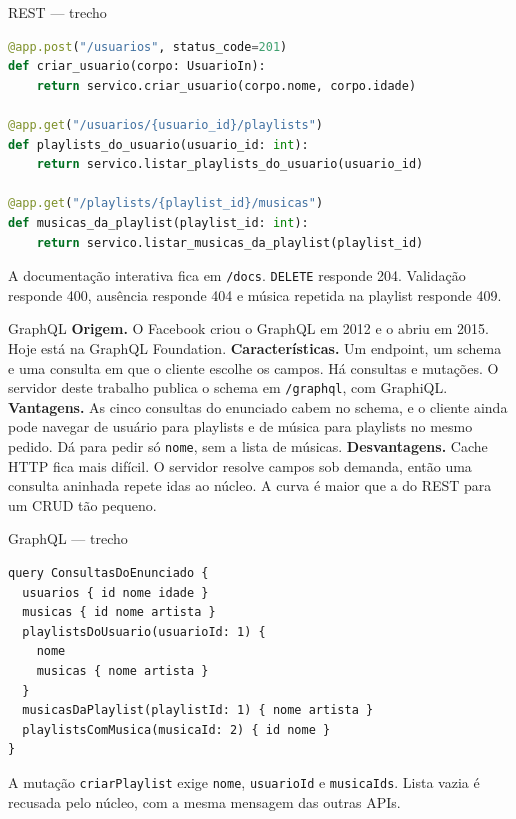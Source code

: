 \documentclass[aspectratio=169,11pt]{beamer}
\begin{document}
\begin{frame}[fragile]{REST --- trecho}
\begin{lstlisting}[language=Python]
@app.post("/usuarios", status_code=201)
def criar_usuario(corpo: UsuarioIn):
    return servico.criar_usuario(corpo.nome, corpo.idade)

@app.get("/usuarios/{usuario_id}/playlists")
def playlists_do_usuario(usuario_id: int):
    return servico.listar_playlists_do_usuario(usuario_id)

@app.get("/playlists/{playlist_id}/musicas")
def musicas_da_playlist(playlist_id: int):
    return servico.listar_musicas_da_playlist(playlist_id)
\end{lstlisting}
A documentação interativa fica em \texttt{/docs}. \texttt{DELETE} responde 204. Validação responde 400, ausência responde 404 e música repetida na playlist responde 409.
\end{frame}

\begin{frame}{GraphQL}
  \textbf{Origem.} O Facebook criou o GraphQL em 2012 e o abriu em 2015. Hoje está na GraphQL Foundation.
  \vspace{0.35em}
  \textbf{Características.} Um endpoint, um schema e uma consulta em que o cliente escolhe os campos. Há consultas e mutações. O servidor deste trabalho publica o schema em \texttt{/graphql}, com GraphiQL.
  \vspace{0.35em}
  \textbf{Vantagens.} As cinco consultas do enunciado cabem no schema, e o cliente ainda pode navegar de usuário para playlists e de música para playlists no mesmo pedido. Dá para pedir só \texttt{nome}, sem a lista de músicas.
  \vspace{0.35em}
  \textbf{Desvantagens.} Cache HTTP fica mais difícil. O servidor resolve campos sob demanda, então uma consulta aninhada repete idas ao núcleo. A curva é maior que a do REST para um CRUD tão pequeno.
\end{frame}

\begin{frame}[fragile]{GraphQL --- trecho}
\begin{lstlisting}
query ConsultasDoEnunciado {
  usuarios { id nome idade }
  musicas { id nome artista }
  playlistsDoUsuario(usuarioId: 1) {
    nome
    musicas { nome artista }
  }
  musicasDaPlaylist(playlistId: 1) { nome artista }
  playlistsComMusica(musicaId: 2) { id nome }
}
\end{lstlisting}
A mutação \texttt{criarPlaylist} exige \texttt{nome}, \texttt{usuarioId} e \texttt{musicaIds}. Lista vazia é recusada pelo núcleo, com a mesma mensagem das outras APIs.
\end{frame}
\end{document}
